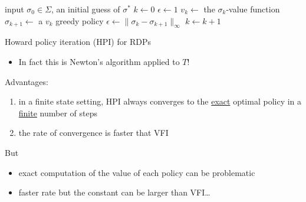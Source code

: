 \begin{frame}
        
    {\small
    \begin{algorithm}[H]
        \DontPrintSemicolon
        input $\sigma_0 \in \Sigma$, an initial guess of $\sigma^*$ \;
        $k \leftarrow 0$ \;
        $\epsilon \leftarrow 1$ \;
        {
            $v_k \leftarrow $ the $\sigma_k$-value function \;
            $\sigma_{k+1} \leftarrow $ a $v_k$ greedy policy \;
            $\epsilon \leftarrow \| \sigma_k - \sigma_{k+1} \|_\infty$ \;
            $k \leftarrow k + 1$ \;
        }
        \caption{\label{algo:fshpi} Howard policy iteration (HPI) for RDPs}
    \end{algorithm}
    }

        \vspace{1em}
        \vspace{1em}
    \begin{itemize}
        \item In fact this is Newton's algorithm applied to $T$!
    \end{itemize}

\end{frame}

\begin{frame}
    
    Advantages:
    \begin{enumerate}
        \item in a finite state setting, HPI always converges to the
            \underline{exact} optimal policy in a \underline{finite} number of steps
        \vspace{0.5em}
        \item the rate of convergence is faster that VFI 
    \end{enumerate}


        \vspace{0.5em}
      But 
      \begin{itemize}
          \item exact computation of the value of each policy can be
              problematic
          \item faster rate but the constant can be larger than VFI\ldots
      \end{itemize}


\end{frame}


